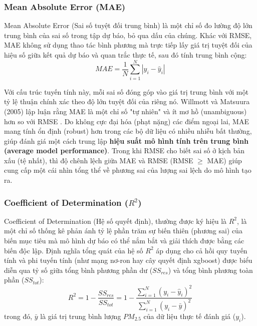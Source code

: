 \subsubsection{Mean Absolute Error (MAE)}

Mean Absolute Error (Sai số tuyệt đối trung bình) là một chỉ số đo lường độ lớn trung bình của sai số trong tập dự báo, bỏ qua dấu của chúng. Khác với RMSE, MAE không sử dụng thao tác bình phương mà trực tiếp lấy giá trị tuyệt đối của hiệu số giữa kết quả dự báo và quan trắc thực tế, sau đó tính trung bình cộng:
\begin{equation}
    MAE = \frac{1}{N} \sum_{i=1}^{N} \left| y_i - \hat{y}_i \right|
\end{equation}

Với cấu trúc tuyến tính này, mỗi sai số đóng góp vào giá trị trung bình với một tỷ lệ thuận chính xác theo độ lớn tuyệt đối của riêng nó. Willmott và Matsuura (2005) lập luận rằng MAE là một chỉ số "tự nhiên" và ít mơ hồ (unambiguous) hơn so với RMSE \cite{willmott2005mae}. Do không cực đại hóa (phạt nặng) các điểm ngoại lai, MAE mang tính ổn định (robust) hơn trong các bộ dữ liệu có nhiều nhiễu bất thường, giúp đánh giá một cách trung lập \textbf{hiệu suất mô hình tính trên trung bình (average model performance)}. Trong khi RMSE cho biết sai số ở kịch bản xấu (tệ nhất), thì độ chênh lệch giữa MAE và RMSE (RMSE $\geq$ MAE) giúp cung cấp một cái nhìn tổng thể về phương sai của lượng sai lệch do mô hình tạo ra.

\subsubsection{Coefficient of Determination ($R^2$)}

Coefficient of Determination (Hệ số quyết định), thường được ký hiệu là $R^2$, là một chỉ số thống kê phản ánh tỷ lệ phần trăm sự biến thiên (phương sai) của biến mục tiêu mà mô hình dự báo có thể nắm bắt và giải thích được bằng các biến độc lập. Định nghĩa tổng quát của hệ số $R^2$ áp dụng cho cả hồi quy tuyến tính và phi tuyến tính (như mạng nơ-ron hay cây quyết định xgboost) \cite{nagelkerke1991r2, tirink2025aqi} được biểu diễn qua tỷ số giữa tổng bình phương phần dư ($SS_{res}$) và tổng bình phương toàn phần ($SS_{tot}$):
\begin{equation}
    R^2 = 1 - \frac{SS_{res}}{SS_{tot}} = 1 - \frac{\sum_{i=1}^{N} (y_i - \hat{y}_i)^2}{\sum_{i=1}^{N} (y_i - \bar{y})^2}
\end{equation}
trong đó, $\bar{y}$ là giá trị trung bình lượng $PM_{2.5}$ của dữ liệu thực tế đánh giá ($y_i$). 

